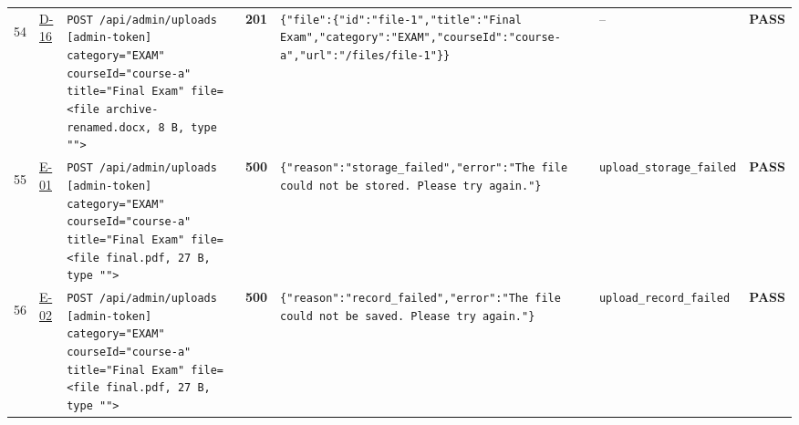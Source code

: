\documentclass[10pt,a4paper]{article}
\begin{document}
\begin{landscape}
\begin{longtable}{@{}P{0.6cm}P{0.9cm}P{8.5cm}P{1.0cm}P{6.2cm}P{4.2cm}P{1.1cm}@{}}
\hypertarget{call54}{54} & \hyperlink{test-D-16}{D-16} & \texttt{POST /\allowbreak{}api/\allowbreak{}admin/\allowbreak{}uploads [admin-\allowbreak{}token] category=\allowbreak{}"\allowbreak{}EXAM"\allowbreak{} courseId=\allowbreak{}"\allowbreak{}course-\allowbreak{}a"\allowbreak{} title=\allowbreak{}"\allowbreak{}Final Exam"\allowbreak{} file=\allowbreak{}<file archive-\allowbreak{}renamed.\allowbreak{}docx,\allowbreak{} 8 B,\allowbreak{} type "\allowbreak{}"\allowbreak{}>} & \textcolor{passgreen}{\textbf{201}} & \texttt{\{"\allowbreak{}file"\allowbreak{}:\allowbreak{}\{"\allowbreak{}id"\allowbreak{}:\allowbreak{}"\allowbreak{}file-\allowbreak{}1"\allowbreak{},\allowbreak{}"\allowbreak{}title"\allowbreak{}:\allowbreak{}"\allowbreak{}Final Exam"\allowbreak{},\allowbreak{}"\allowbreak{}category"\allowbreak{}:\allowbreak{}"\allowbreak{}EXAM"\allowbreak{},\allowbreak{}"\allowbreak{}courseId"\allowbreak{}:\allowbreak{}"\allowbreak{}course-\allowbreak{}a"\allowbreak{},\allowbreak{}"\allowbreak{}url"\allowbreak{}:\allowbreak{}"\allowbreak{}/\allowbreak{}files/\allowbreak{}file-\allowbreak{}1"\allowbreak{}\}\}} & -- & \textcolor{passgreen}{\textbf{PASS}} \\
\hypertarget{call55}{55} & \hyperlink{test-E-01}{E-01} & \texttt{POST /\allowbreak{}api/\allowbreak{}admin/\allowbreak{}uploads [admin-\allowbreak{}token] category=\allowbreak{}"\allowbreak{}EXAM"\allowbreak{} courseId=\allowbreak{}"\allowbreak{}course-\allowbreak{}a"\allowbreak{} title=\allowbreak{}"\allowbreak{}Final Exam"\allowbreak{} file=\allowbreak{}<file final.\allowbreak{}pdf,\allowbreak{} 27 B,\allowbreak{} type "\allowbreak{}"\allowbreak{}>} & \textcolor{failred}{\textbf{500}} & \texttt{\{"\allowbreak{}reason"\allowbreak{}:\allowbreak{}"\allowbreak{}storage\_\allowbreak{}failed"\allowbreak{},\allowbreak{}"\allowbreak{}error"\allowbreak{}:\allowbreak{}"\allowbreak{}The file could not be stored.\allowbreak{} Please try again.\allowbreak{}"\allowbreak{}\}} & \texttt{upload\_\allowbreak{}storage\_\allowbreak{}failed} & \textcolor{passgreen}{\textbf{PASS}} \\
\hypertarget{call56}{56} & \hyperlink{test-E-02}{E-02} & \texttt{POST /\allowbreak{}api/\allowbreak{}admin/\allowbreak{}uploads [admin-\allowbreak{}token] category=\allowbreak{}"\allowbreak{}EXAM"\allowbreak{} courseId=\allowbreak{}"\allowbreak{}course-\allowbreak{}a"\allowbreak{} title=\allowbreak{}"\allowbreak{}Final Exam"\allowbreak{} file=\allowbreak{}<file final.\allowbreak{}pdf,\allowbreak{} 27 B,\allowbreak{} type "\allowbreak{}"\allowbreak{}>} & \textcolor{failred}{\textbf{500}} & \texttt{\{"\allowbreak{}reason"\allowbreak{}:\allowbreak{}"\allowbreak{}record\_\allowbreak{}failed"\allowbreak{},\allowbreak{}"\allowbreak{}error"\allowbreak{}:\allowbreak{}"\allowbreak{}The file could not be saved.\allowbreak{} Please try again.\allowbreak{}"\allowbreak{}\}} & \texttt{upload\_\allowbreak{}record\_\allowbreak{}failed} & \textcolor{passgreen}{\textbf{PASS}} \\

\end{longtable}
\end{landscape}
\end{document}
